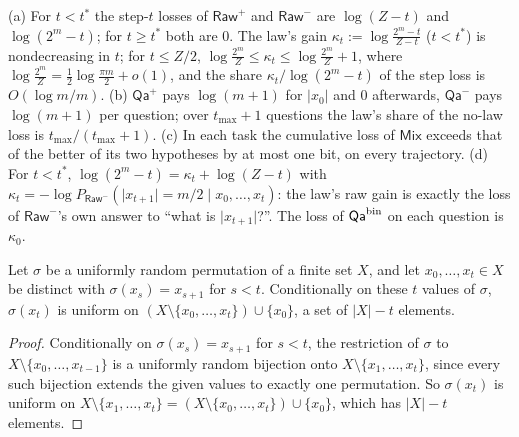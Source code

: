 \begin{proposition}\label{prop:phil:conservation}
(a) For $t<t^*$ the step-$t$ losses of $\mathsf{Raw}^+$ and $\mathsf{Raw}^-$ are $\log(Z-t)$ and $\log(2^m-t)$; for $t\ge t^*$ both are $0$. The law's gain $\kappa_t:=\log\frac{2^m-t}{Z-t}$ ($t<t^*$) is nondecreasing in $t$; for $t\le Z/2$, $\log\frac{2^m}Z\le\kappa_t\le\log\frac{2^m}Z+1$, where $\log\frac{2^m}Z=\frac12\log\frac{\pi m}2+o(1)$, and the share $\kappa_t/\log(2^m-t)$ of the step loss is $O(\log m/m)$.
(b) $\mathsf{Qa}^+$ pays $\log(m+1)$ for $\lvert x_0\rvert$ and $0$ afterwards, $\mathsf{Qa}^-$ pays $\log(m+1)$ per question; over $t_{\max}+1$ questions the law's share of the no-law loss is $t_{\max}/(t_{\max}+1)$.
(c) In each task the cumulative loss of $\mathsf{Mix}$ exceeds that of the better of its two hypotheses by at most one bit, on every trajectory.
(d) For $t<t^*$, $\log(2^m-t)=\kappa_t+\log(Z-t)$ with $\kappa_t=-\log P_{\mathsf{Raw}^-}(\lvert x_{t+1}\rvert=m/2\mid x_0,\dots,x_t)$: the law's raw gain is exactly the loss of $\mathsf{Raw}^-$'s own answer to ``what is $\lvert x_{t+1}\rvert$?''. The loss of $\mathsf{Qa}^{\rm bin}$ on each question is $\kappa_0$.
\end{proposition}

\begin{lemma}\label{lem:phil:permutation}
Let $\sigma$ be a uniformly random permutation of a finite set $X$, and let $x_0,\dots,x_t\in X$ be distinct with $\sigma(x_s)=x_{s+1}$ for $s<t$. Conditionally on these $t$ values of $\sigma$, $\sigma(x_t)$ is uniform on $(X\setminus\{x_0,\dots,x_t\})\cup\{x_0\}$, a set of $\lvert X\rvert-t$ elements.
\end{lemma}

\begin{proof}
Conditionally on $\sigma(x_s)=x_{s+1}$ for $s<t$, the restriction of $\sigma$ to $X\setminus\{x_0,\dots,x_{t-1}\}$ is a uniformly random bijection onto $X\setminus\{x_1,\dots,x_t\}$, since every such bijection extends the given values to exactly one permutation. So $\sigma(x_t)$ is uniform on $X\setminus\{x_1,\dots,x_t\}=(X\setminus\{x_0,\dots,x_t\})\cup\{x_0\}$, which has $\lvert X\rvert-t$ elements.
\end{proof}

